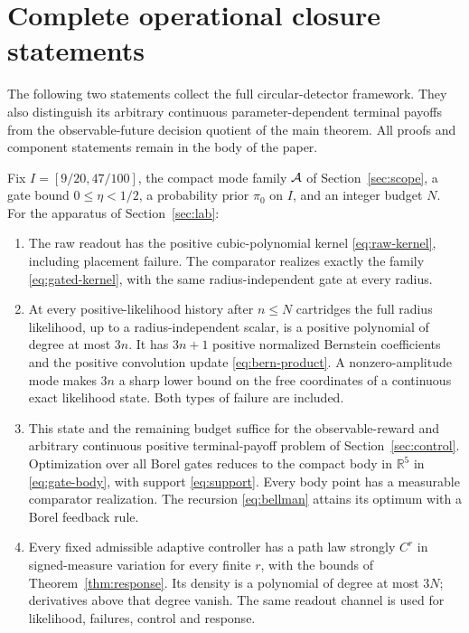 \section{Complete operational closure statements}\label{app:operational}
The following two statements collect the full circular-detector framework.
They also distinguish its arbitrary continuous parameter-dependent terminal
payoffs from the observable-future decision quotient of the main theorem.
All proofs and component statements remain in the body of the paper.

\begin{theorem}\label{thm:main}
Fix $I=[9/20,47/100]$, the compact mode family $\mathcal A$ of
Section~\ref{sec:scope}, a gate bound $0\le\eta<1/2$, a probability prior
$\pi_0$ on $I$, and an integer budget $N$. For the apparatus of
Section~\ref{sec:lab}:
\begin{enumerate}
\item The raw readout has the positive cubic-polynomial kernel
\eqref{eq:raw-kernel}, including placement failure. The comparator realizes
exactly the family \eqref{eq:gated-kernel}, with the same radius-independent
gate at every radius.
\item At every positive-likelihood history after $n\le N$ cartridges the
full radius likelihood, up to a radius-independent scalar, is a positive
polynomial of degree at most $3n$. It has $3n+1$ positive normalized
Bernstein coefficients and the positive convolution update
\eqref{eq:bern-product}. A nonzero-amplitude mode makes $3n$ a sharp lower
bound on the free coordinates of a continuous exact likelihood state.
Both types of failure are included.
\item This state and the remaining budget suffice for the observable-reward
and arbitrary continuous positive terminal-payoff problem of
Section~\ref{sec:control}. Optimization over all Borel gates reduces to the
compact body in $\mathbb R^5$ in \eqref{eq:gate-body}, with support
\eqref{eq:support}. Every body point has a measurable comparator realization.
The recursion \eqref{eq:bellman} attains its optimum with a Borel feedback rule.
\item Every fixed admissible adaptive controller has a path law strongly
$C^r$ in signed-measure variation for every finite $r$, with the bounds of
Theorem~\ref{thm:response}. Its density is a polynomial of degree at most
$3N$; derivatives above that degree vanish. The same readout channel is
used for likelihood, failures, control and response.
\end{enumerate}
\end{theorem}
